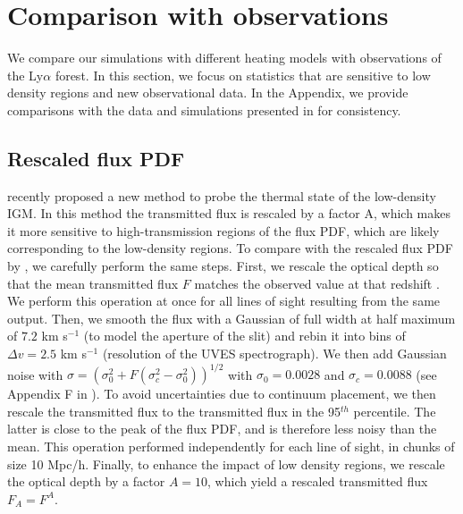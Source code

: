 \documentclass[numberedappendix]{emulateapj}
\begin{document}
\section{Comparison with observations}\label{sec:obs}
We compare our simulations with different heating models with observations of the Ly$\alpha$ forest. In this section,  we focus on statistics that are sensitive to low density regions and new observational data. In the Appendix, we provide comparisons with the data and simulations presented in  \citet{2012MNRAS.423..149P} for consistency. 

\subsection{Rescaled flux PDF}
\citet{2017MNRAS.466.2690R} recently proposed a new method to probe the thermal state of the low-density IGM.  In this method the transmitted flux is rescaled by a factor A, which makes it more sensitive to high-transmission regions of the flux PDF, which are likely corresponding to the low-density regions. To compare with the rescaled flux PDF by \citet{2017MNRAS.466.2690R}, we carefully perform the same steps. First, we rescale the optical depth so that the mean transmitted flux $F$ matches the observed value at that redshift \citep{2013MNRAS.436.1023B}. We perform this operation at once for all lines of sight resulting from the same output.  Then, we smooth the flux with a Gaussian of full width at half maximum of $7.2$ km s$^{-1}$ (to model the aperture of the slit) and rebin it into bins of $\Delta v=2.5$ km s$^{-1}$ (resolution of the UVES spectrograph). We then add Gaussian noise with $\sigma=(\sigma_0^2+F(\sigma_c^2-\sigma_0^2))^{1/2}$ with $\sigma_0=0.0028$ and $\sigma_c=0.0088$ (see Appendix F in \citet{2017MNRAS.466.2690R}). To avoid uncertainties due to continuum placement, we then rescale the transmitted flux to the transmitted flux in the 95$^{th}$ percentile. The latter is close to the peak of the flux PDF, and is therefore less noisy than the mean. This operation performed independently for each line of sight, in chunks of size 10 Mpc/h. Finally, to enhance the impact of low density regions, we rescale the optical depth by a factor $A=10$, which yield a rescaled transmitted flux $F_A=F^A$.

\end{document}
